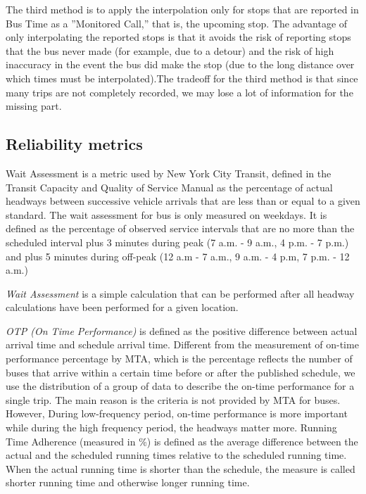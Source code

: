 \documentclass[12pt]{report}
\begin{document}
The third method is to apply the interpolation only for stops that are reported in Bus Time as a ”Monitored Call,” that is, the upcoming stop. The advantage of only interpolating the reported stops is that it avoids the risk of reporting stops that the bus never made (for example, due to a detour) and the risk of high inaccuracy in the event the bus did make the stop (due to the long distance over which times must be interpolated).The tradeoff for the third method is that since many trips are not completely recorded, we may lose a lot of information for the missing part.

\subsection{Reliability metrics}

Wait Assessment is a metric used by New York City Transit, defined in the Transit Capacity and Quality of Service Manual as the percentage of actual headways between successive vehicle arrivals that are less than or equal to a given standard. The wait assessment for bus is only measured on weekdays. It is defined as the percentage of observed service intervals that are no more than the scheduled interval plus 3 minutes during peak (7 a.m. - 9 a.m., 4 p.m. - 7 p.m.) and plus 5 minutes during off-peak (12 a.m - 7 a.m., 9 a.m. - 4 p.m, 7 p.m. - 12 a.m.)

\textit{Wait Assessment} is a simple calculation that can be performed after all headway calculations have been performed for a given location.

\textit{OTP (On Time Performance)} is defined as the positive difference between actual arrival time and schedule arrival time. Different from the measurement of on-time performance percentage by MTA, which is the percentage reflects the number of buses that arrive within a certain time before or after the published schedule, we use the distribution of a group of data to describe the on-time performance for a single trip. The main reason is the criteria is not provided by MTA for buses. However, During low-frequency period, on-time performance is more important while during the high frequency period, the headways matter more. Running Time Adherence (measured in \%) is defined as the average difference between the actual and the scheduled running times relative to the scheduled running time. When the actual running time is shorter than the schedule, the measure is called shorter running time and otherwise longer running time.
\end{document}
